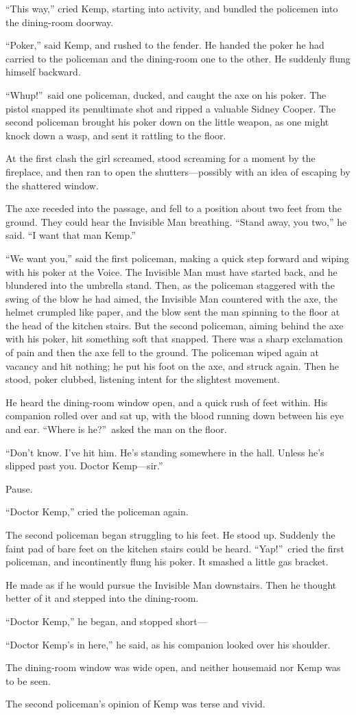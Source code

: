 “This way,” cried Kemp, starting into activity, and bundled the policemen into the dining-room doorway.

“Poker,” said Kemp, and rushed to the fender. He handed the poker he had carried to the policeman and the dining-room one to the other. He suddenly flung himself backward.

“Whup!”\ said one policeman, ducked, and caught the axe on his poker. The pistol snapped its penultimate shot and ripped a valuable Sidney Cooper. The second policeman brought his poker down on the little weapon, as one might knock down a wasp, and sent it rattling to the floor.

At the first clash the girl screamed, stood screaming for a moment by the fireplace, and then ran to open the shutters—possibly with an idea of escaping by the shattered window.

The axe receded into the passage, and fell to a position about two feet from the ground. They could hear the Invisible Man breathing. “Stand away, you two,” he said. “I want that man Kemp.”

“We want you,” said the first policeman, making a quick step forward and wiping with his poker at the Voice. The Invisible Man must have started back, and he blundered into the umbrella stand. Then, as the policeman staggered with the swing of the blow he had aimed, the Invisible Man countered with the axe, the helmet crumpled like paper, and the blow sent the man spinning to the floor at the head of the kitchen stairs. But the second policeman, aiming behind the axe with his poker, hit something soft that snapped. There was a sharp exclamation of pain and then the axe fell to the ground. The policeman wiped again at vacancy and hit nothing; he put his foot on the axe, and struck again. Then he stood, poker clubbed, listening intent for the slightest movement.

He heard the dining-room window open, and a quick rush of feet within. His companion rolled over and sat up, with the blood running down between his eye and ear. “Where is he?”\ asked the man on the floor.

“Don’t know. I’ve hit him. He’s standing somewhere in the hall. Unless he’s slipped past you. Doctor Kemp—sir.”

Pause.

“Doctor Kemp,” cried the policeman again.

The second policeman began struggling to his feet. He stood up. Suddenly the faint pad of bare feet on the kitchen stairs could be heard. “Yap!”\ cried the first policeman, and incontinently flung his poker. It smashed a little gas bracket.

He made as if he would pursue the Invisible Man downstairs. Then he thought better of it and stepped into the dining-room.

“Doctor Kemp,” he began, and stopped short—

“Doctor Kemp’s in here,” he said, as his companion looked over his shoulder.

The dining-room window was wide open, and neither housemaid nor Kemp was to be seen.

The second policeman’s opinion of Kemp was terse and vivid.